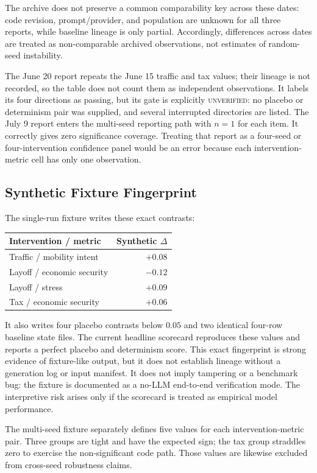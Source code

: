 \documentclass[letterpaper]{article}
\begin{document}
The archive does not preserve a common comparability key across these dates: code revision,
prompt/provider, and population are unknown for all three reports, while baseline lineage is only partial.
Accordingly, differences across dates are treated as non-comparable archived observations, not estimates
of random-seed instability.

The June 20 report repeats the June 15 traffic and tax values; their lineage is not recorded, so the table
does not count them as independent observations. It labels its four directions as passing, but its gate is
explicitly
\textsc{unverified}: no placebo or determinism pair was supplied, and several interrupted directories are
listed. The July 9 report enters the multi-seed reporting path with $n=1$ for each item. It correctly gives
zero significance coverage. Treating that report as a four-seed or four-intervention confidence panel
would be an error because each intervention-metric cell has only one observation.

\subsection{Synthetic Fixture Fingerprint}

The single-run fixture writes these exact contrasts:
\begin{center}
\begin{tabular}{lr}
\toprule
Intervention / metric & Synthetic $\Delta$ \\
\midrule
Traffic / mobility intent & $+0.08$ \\
Layoff / economic security & $-0.12$ \\
Layoff / stress & $+0.09$ \\
Tax / economic security & $+0.06$ \\
\bottomrule
\end{tabular}
\end{center}
It also writes four placebo contrasts below $0.05$ and two identical four-row baseline state files. The
current headline scorecard reproduces these values and reports a perfect placebo and determinism score.
This exact fingerprint is strong evidence of fixture-like output, but it does not establish lineage without
a generation log or input manifest. It does not imply tampering or a benchmark bug: the fixture is
documented as a no-LLM end-to-end verification mode. The interpretive risk arises only if the scorecard is
treated as empirical model performance.

The multi-seed fixture separately defines five values for each intervention-metric pair. Three groups are
tight and have the expected sign; the tax group straddles zero to exercise the non-significant code path.
Those values are likewise excluded from cross-seed robustness claims.
\end{document}
